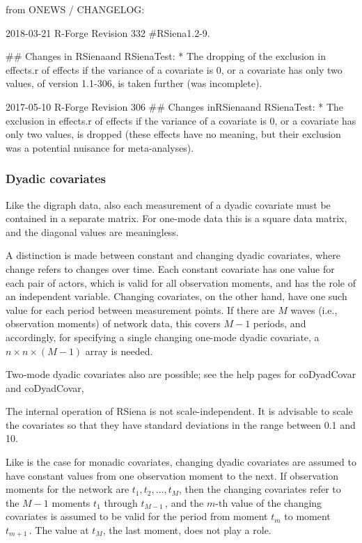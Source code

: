 \documentclass[a4paper,fleqn,11pt]{article}
\newcommand{\+}{\, + \,}
\newcommand{\sfn}[1]{\textsf{#1}}
\newcommand{\RS}{{\sf \textsf{RSiena} }}
\begin{document}
from ONEWS / CHANGELOG:

2018-03-21 R-Forge Revision 332
#\textsf{RSiena}1.2-9.

## Changes in \textsf{RSiena}and RSienaTest:
   * The dropping of the exclusion in effects.r of effects if the variance of a
     covariate is 0, or a covariate has only two values, of version 1.1-306,
     is  taken further (was incomplete).

2017-05-10 R-Forge Revision 306
## Changes in\textsf{RSiena}and \textsf{RSienaTest}:
   * The exclusion in effects.r of effects if the variance of a covariate is 0,
     or a covariate has only two values, is dropped (these effects have no
     meaning, but their exclusion was a potential nuisance for meta-analyses).
\fi



\subsubsection{Dyadic covariates}

Like the digraph data, also each measurement of a dyadic covariate
must be contained in a separate matrix.
For one-mode data this is a square data matrix,
and the diagonal values are meaningless.

A distinction is made between constant and changing dyadic
covariates, where change refers to changes over time. Each constant
covariate has one value for each pair of actors, which is valid for
all observation moments, and has the role of an independent
variable. Changing covariates, on the other hand, have one such
value for each period between measurement points. If there are $M$
waves (i.e., observation moments) of network data,
this covers $M-1$ periods, and accordingly,
for specifying a single changing one-mode dyadic covariate,
a $n \times n \times (M-1)$ array is needed.

Two-mode dyadic covariates also are possible; see the help pages for
\sfn{coDyadCovar} and \sfn{coDyadCovar},

The internal operation of \RS is not scale-independent.
It is advisable to scale the covariates so that they have
standard deviations in the range between 0.1 and 10.

Like is the case for monadic  covariates,
changing dyadic covariates are assumed to have constant values from one
observation moment to the next. If observation moments for the
network are $t_1, t_2, ..., t_M$, then the changing covariates
refer to the $M-1$ moments $t_1$ through $t_{M-1}\,$, and
the $m$-th value of the changing covariates is assumed to be valid
for the period from moment $t_m$ to moment $t_{m+1}\,$.
The value at $t_M$, the last moment, does not play a role.
\end{document}
